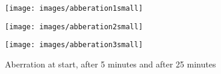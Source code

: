 \begin{figure}[htb!]
	\begin{minipage}{.3\textwidth}
		\centering\texttt{[image: images/abberation1small]}
	\end{minipage}
	\begin{minipage}{.3\textwidth}
		\centering\texttt{[image: images/abberation2small]}
	\end{minipage}
	\begin{minipage}{.3\textwidth}
		\centering\texttt{[image: images/abberation3small]}
	\end{minipage}
	\caption[Bla (self-made)]{Aberration at start, after 5 minutes and after 25 minutes}
	\label{fig:bla}
\end{figure}
\FloatBarrier

